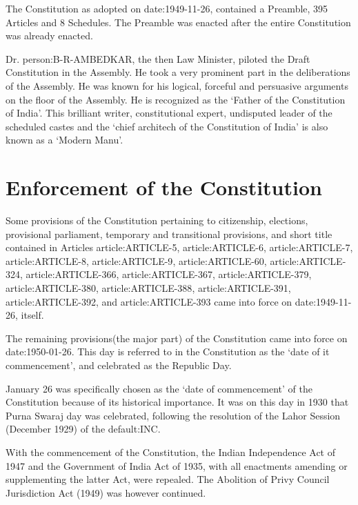 \begin{multicols}{2}
{ The Constitution as adopted on \gls{date:1949-11-26}, contained a Preamble, 395 Articles and 8 Schedules}. The Preamble was enacted after the entire Constitution was already enacted.

Dr. \gls{person:B-R-AMBEDKAR}, the then Law Minister, piloted the Draft Constitution in the Assembly. He took a very prominent part in the deliberations of the Assembly. He was known for his logical, forceful and persuasive arguments on the floor of the Assembly. He is recognized as the `Father of the Constitution of India'. This brilliant writer, constitutional expert, undisputed leader of the scheduled castes and the `chief architech of the Constitution of India' is also known as a `Modern Manu'.

\section{Enforcement of the Constitution}

Some provisions of the Constitution pertaining to citizenship, elections, provisional parliament, temporary and transitional provisions, and short title contained in Articles \gls{article:ARTICLE-5}, \gls{article:ARTICLE-6}, \gls{article:ARTICLE-7}, \gls{article:ARTICLE-8}, \gls{article:ARTICLE-9}, \gls{article:ARTICLE-60}, \gls{article:ARTICLE-324}, \gls{article:ARTICLE-366}, \gls{article:ARTICLE-367}, \gls{article:ARTICLE-379}, \gls{article:ARTICLE-380}, \gls{article:ARTICLE-388}, \gls{article:ARTICLE-391}, \gls{article:ARTICLE-392}, and \gls{article:ARTICLE-393} came into force on \gls{date:1949-11-26}, itself.

The remaining provisions(the major part) of the Constitution came into force on \gls{date:1950-01-26}. This day is referred to in the Constitution as the `date of it commencement', and celebrated as the Republic Day.

January 26 was specifically chosen as the `date of commencement' of the Constitution because of its historical importance. It was on this day in 1930 that { Purna Swaraj} day was celebrated, following the resolution of the Lahor Session (December 1929) of the \gls{default:INC}.

With the commencement of the Constitution, the Indian Independence Act of 1947 and the Government of India Act of 1935, with all enactments amending or supplementing the latter Act, were repealed. The Abolition of Privy Council Jurisdiction Act (1949) was however continued.


\end{multicols}
